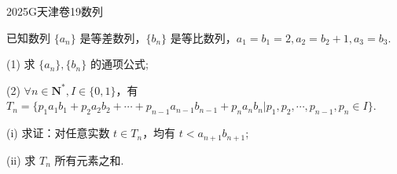 
\begin{problem}{2025}{G}{天津卷}{19}{数列}

已知数列 $\{a_n\}$ 是等差数列，$\{b_n\}$ 是等比数列，$a_1=b_1=2, a_2=b_2+1, a_3=b_3$.

(1) 求 $\{a_n\}, \{b_n\}$ 的通项公式;

(2) $\forall n \in \mathbf{N}^*, I \in \{0,1\}$，有 $T_n=\{p_1 a_1 b_1+p_2 a_2 b_2+\cdots+p_{n-1} a_{n-1} b_{n-1}+p_n a_n b_n | p_1, p_2, \cdots, p_{n-1}, p_n \in I\}$.

(i) 求证：对任意实数 $t \in T_n$，均有 $t<a_{n+1} b_{n+1}$;

(ii) 求 $T_n$ 所有元素之和.

\end{problem}